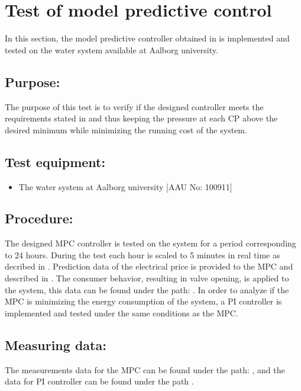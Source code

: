 \section{Test of model predictive control}
\label{sec:MPT_test}

In this section, the model predictive controller obtained in  is implemented and tested on the water system available at Aalborg university. 

\subsection*{Purpose:}

The purpose of this test is to verify if the designed controller meets the requirements stated in  and thus keeping the pressure at each CP above the desired minimum while minimizing the running cost of the system.

\subsection*{Test equipment:}
\begin{itemize}
\item The water system at Aalborg university [AAU No: 100911]
\end{itemize}

\subsection*{Procedure:}
The designed MPC controller is tested on the system for a period corresponding to 24 hours. During the test each hour is scaled to 5 minutes in real time as decribed in . Prediction data of the electrical price is provided to the MPC and described in . The consumer behavior, resulting in valve opening, is applied to the system, this data can be found under the path: . 
In order to analyze if the MPC is minimizing the energy consumption of the system, a PI controller is implemented and tested under the same conditions as the MPC.    

\subsection*{Measuring data:}
The measurements data for the MPC can be found under the path: , and the data for PI controller can be found under the path . 

